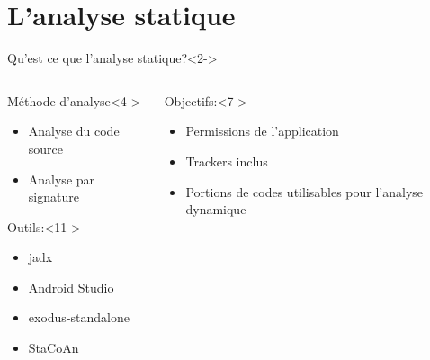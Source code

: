 \documentclass[aspectratio=1610,]{beamer}%
\begin{document}
 
\section{L'analyse statique}
\begin{frame}[t]
  \slidetitle[]
  \begin{block}{Qu'est ce que l'analyse statique?}<2->
  \end{block}
  \vspace{-0.5cm}
  \begin{columns}[t]
    \begin{column}{0.48\textwidth}
      \begin{block}{Méthode d'analyse}<4->
        \begin{itemize}
        \item<5-> Analyse du code source
        \item<6-> Analyse par signature
        \end{itemize}
        \end{block}
      \begin{block} {Outils:}<11->
      \begin{itemize}
      \item<12-> jadx
      \item<13-> Android Studio
      \item<14-> exodus-standalone
      \item<15-> StaCoAn
      \end{itemize}
      \end{block}
    \end{column}
  \begin{column}{0.48\textwidth}
      \begin{block}{Objectifs:}<7->
      \begin{itemize}
        \item<8-> Permissions de l'application
        \item<9-> Trackers inclus
        \item<10-> Portions de codes utilisables pour l'analyse dynamique
        \end{itemize}
      \end{block}
    \end{column}
  \end{columns}
  \end{frame}
  
\end{document}
